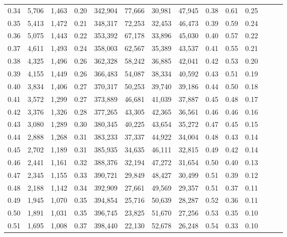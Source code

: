 \begin{tabular}{rrrrrrrrrrrrrr}
0.34 &   5,706 &  1,463 &  0.20 &  342,904 &   77,666 &  30,981 &  47,945 &  0.38 &  0.61 &      0.25 \\
0.35 &   5,413 &  1,472 &  0.21 &  348,317 &   72,253 &  32,453 &  46,473 &  0.39 &  0.59 &      0.24 \\
0.36 &   5,075 &  1,443 &  0.22 &  353,392 &   67,178 &  33,896 &  45,030 &  0.40 &  0.57 &      0.22 \\
0.37 &   4,611 &  1,493 &  0.24 &  358,003 &   62,567 &  35,389 &  43,537 &  0.41 &  0.55 &      0.21 \\
0.38 &   4,325 &  1,496 &  0.26 &  362,328 &   58,242 &  36,885 &  42,041 &  0.42 &  0.53 &      0.20 \\
0.39 &   4,155 &  1,449 &  0.26 &  366,483 &   54,087 &  38,334 &  40,592 &  0.43 &  0.51 &      0.19 \\
0.40 &   3,834 &  1,406 &  0.27 &  370,317 &   50,253 &  39,740 &  39,186 &  0.44 &  0.50 &      0.18 \\
0.41 &   3,572 &  1,299 &  0.27 &  373,889 &   46,681 &  41,039 &  37,887 &  0.45 &  0.48 &      0.17 \\
0.42 &   3,376 &  1,326 &  0.28 &  377,265 &   43,305 &  42,365 &  36,561 &  0.46 &  0.46 &      0.16 \\
0.43 &   3,080 &  1,289 &  0.30 &  380,345 &   40,225 &  43,654 &  35,272 &  0.47 &  0.45 &      0.15 \\
0.44 &   2,888 &  1,268 &  0.31 &  383,233 &   37,337 &  44,922 &  34,004 &  0.48 &  0.43 &      0.14 \\
0.45 &   2,702 &  1,189 &  0.31 &  385,935 &   34,635 &  46,111 &  32,815 &  0.49 &  0.42 &      0.14 \\
0.46 &   2,441 &  1,161 &  0.32 &  388,376 &   32,194 &  47,272 &  31,654 &  0.50 &  0.40 &      0.13 \\
0.47 &   2,345 &  1,155 &  0.33 &  390,721 &   29,849 &  48,427 &  30,499 &  0.51 &  0.39 &      0.12 \\
0.48 &   2,188 &  1,142 &  0.34 &  392,909 &   27,661 &  49,569 &  29,357 &  0.51 &  0.37 &      0.11 \\
0.49 &   1,945 &  1,070 &  0.35 &  394,854 &   25,716 &  50,639 &  28,287 &  0.52 &  0.36 &      0.11 \\
0.50 &   1,891 &  1,031 &  0.35 &  396,745 &   23,825 &  51,670 &  27,256 &  0.53 &  0.35 &      0.10 \\
0.51 &   1,695 &  1,008 &  0.37 &  398,440 &   22,130 &  52,678 &  26,248 &  0.54 &  0.33 &      0.10 \\

\end{tabular}

